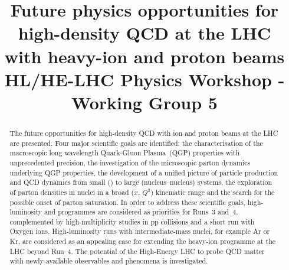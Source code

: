 \documentclass[11pt,twoside,a4paper]{cernrep}
\def\bibfiles{\main/bib/chapter,\main/introduction/bib/section,\main/schedule/bib/section,\main/hf/bib/section,\main/quarkonia/bib/section,\main/thermalradiation/bib/section,\main/flow/bib/section,\main/smallsystems/bib/section,\main/lightflavour/bib/section,\main/jets/bib/section,\main/smallx/bib/section,\main/beyond/bib/section,\main/helhc/bib/section,\main/accelerator/bib/section,\main/smallAexec/bib/section}
\providecommand{\biblio}{\nocite{article-minimal}\clearpage}  %
\begin{document}
\newcommand{\main}{.}



\title{Future physics opportunities for high-density QCD at the LHC\\ with heavy-ion and proton beams \\
\vspace{5mm}
\small{HL/HE-LHC Physics Workshop - Working Group 5}}


\maketitle

\begin{abstract}
 The future opportunities for high-density QCD with ion and proton beams at the LHC are presented. Four major scientific goals are identified: the characterisation of the macroscopic long wavelength Quark-Gluon Plasma~(QGP) properties with unprecedented precision, the investigation of the microscopic parton dynamics underlying QGP properties, the development of a unified picture of particle production and QCD dynamics from small (\pp) to large (nucleus--nucleus) systems, the exploration of parton densities in nuclei in a broad ($x$, $Q^2$) kinematic range and the search for the possible onset of parton saturation. In order to address these scientific goals, high-luminosity \PbPb and \pPb programmes are considered as priorities for Runs~3 and~4, complemented by high-multiplicity studies in pp collisions and a  short run with Oxygen ions. High-luminosity runs with intermediate-mass nuclei, for example Ar or Kr, are considered as an appealing case for extending the heavy-ion programme at the LHC beyond Run~4. The potential of the High-Energy LHC to probe QCD matter with newly-available observables and phenomena is investigated.
\end{abstract}

\setcounter{tocdepth}{2}
{ 
\baselineskip=12pt
\tableofcontents
}
\clearpage


\clearpage

\clearpage

\clearpage

\clearpage

\clearpage

\clearpage

\clearpage

\clearpage

\clearpage

\clearpage

\clearpage

\clearpage

\clearpage



%
%
\footnotesize
\biblio
\end{document}
